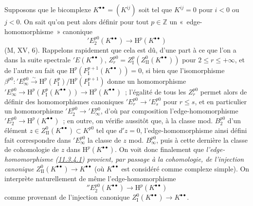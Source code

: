 \begin{env}[11.3.4]
\label{0.11.3.4-fr}
Supposons que le bicomplexe $K^{\bullet\bullet}=(K^{ij})$ soit tel que
$K^{ij}=0$ pour $i<0$ ou $j<0$. On sait qu'on peut alors définir pour tout
$p\in\mathbb Z$ un «~edge-homomorphisme~» canonique
\[
\label{0.11.3.4.1-fr}
  'E_2^{p0}(K^{\bullet\bullet})\longrightarrow
  \mathrm H^p(K^{\bullet\bullet})
  \tag{11.3.4.1}
\]
(M, XV, 6). Rappelons rapidement que cela est dû, d'une part à ce que l'on a
dans la suite spectrale $'E(K^{\bullet\bullet})$,
$Z_r^{p0}=Z_{\mathrm I}^p(Z_{\mathrm{II}}^0(K^{\bullet\bullet}))$ pour
$2\leq r\leq+\infty$, et de l'autre au fait que
$\mathrm H^p(F_{\mathrm I}^{p+1}(K^{\bullet\bullet}))=0$, si bien que
l'isomorphisme
$\beta^{p0}:'E_\infty^{p0}\xrightarrow{\sim}
\mathrm H^p(F_{\mathrm I}^p)/\mathrm H^p(F_{\mathrm I}^{p+1})$ donne un
homomorphisme
$'E_\infty^{p0}\to\mathrm H^p(F_{\mathrm I}^p(K^{\bullet\bullet}))
\to\mathrm H^p(K^{\bullet\bullet})$~; l'égalité de tous les $Z_r^{p0}$ permet
alors de définir des homomorphismes canoniques
$'E_r^{p0}\to'E_s^{p0}$ pour $r\leq s$, et en particulier un homomorphisme
$'E_2^{p0}\to'E_\infty^{p0}$, d'où par composition l'edge-homomorphisme
$'E_2^{p0}\to\mathrm H^p(K^{\bullet\bullet})$~; en outre, on vérifie aussitôt
que, à la classe mod. $B_2^{p0}$ d'un élément
$z\in Z_{\mathrm{II}}^0(K^{\bullet\bullet})\subset K^{p0}$ tel que $d'z=0$,
l'edge-homomorphisme ainsi défini fait correspondre dans $'E_\infty^{p0}$ la
classe de $z$ mod. $B_\infty^{p0}$, puis à cette dernière la classe de
cohomologie de $z$ dans $\mathrm H^p(K^{\bullet\bullet})$. On voit donc
finalement que \emph{l'edge-homomorphisme
(\hyperref[0.11.3.4.1-fr]{11.3.4.1}) provient, par passage à la cohomologie,
de l'injection canonique}
$Z_{\mathrm{II}}^0(K^{\bullet\bullet})\to K^{\bullet\bullet}$ (où
$K^{\bullet\bullet}$ est considéré comme complexe simple). On interprète
naturellement de même l'edge-homomorphisme
\[
\label{0.11.3.4.2-fr}
  ''E_2^{p0}(K^{\bullet\bullet})\longrightarrow
  \mathrm H^p(K^{\bullet\bullet})
  \tag{11.3.4.2}
\]
comme provenant de l'injection canonique
$Z_{\mathrm I}^0(K^{\bullet\bullet})\to K^{\bullet\bullet}$.
\end{env}


